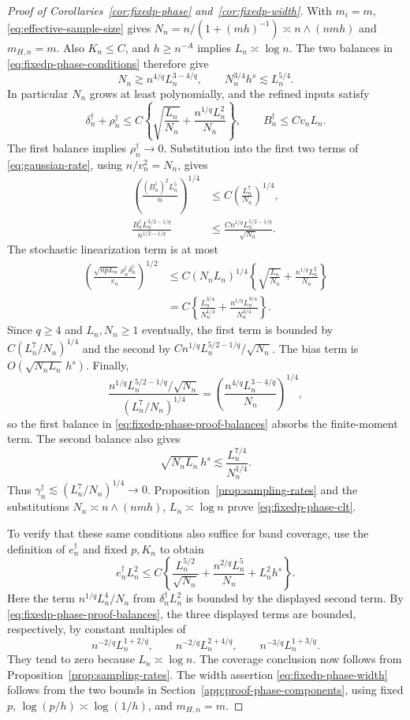 \documentclass[12pt]{article}
\numberwithin{equation}{section}
\begin{document}
\begin{proof}[Proof of Corollaries~\ref{cor:fixedp-phase} and~\ref{cor:fixedp-width}]
With $m_i=m$, \eqref{eq:effective-sample-size} gives
$N_n=n/(1+(mh)^{-1})\asymp n\wedge(nmh)$ and $m_{H,n}=m$.
Also $K_n\le C$, and $h\ge n^{-A}$ implies $L_n\asymp\log n$.
The two balances in \eqref{eq:fixedp-phase-conditions} therefore give
\begin{equation}
N_n\gtrsim n^{4/q}L_n^{3-4/q},\qquad
N_n^{3/4}h^s\lesssim L_n^{5/4}.
\label{eq:fixedp-phase-proof-balances}
\end{equation}
In particular $N_n$ grows at least polynomially, and the refined inputs
satisfy
\[
\delta_n^\dagger+\rho_n^\dagger
\le C\left\{\sqrt{\frac{L_n}{N_n}}
+\frac{n^{1/q}L_n^2}{N_n}\right\},\qquad
B_n^\dagger\le Cv_nL_n.
\]
The first balance implies $\rho_n^\dagger\to0$.
Substitution into the first two terms of
\eqref{eq:gaussian-rate}, using $n/v_n^2=N_n$, gives
\begin{align*}
\left(\frac{(B_n^\dagger)^2L_n^5}{n}\right)^{1/4}
&\le C\left(\frac{L_n^7}{N_n}\right)^{1/4},\\
\frac{B_n^\dagger L_n^{3/2-1/q}}{n^{1/2-1/q}}
&\le\frac{Cn^{1/q}L_n^{5/2-1/q}}{\sqrt{N_n}}.
\end{align*}
The stochastic linearization term is at most
\[
\begin{aligned}
\left(\frac{\sqrt{npL_n}\,
\rho_n^\dagger\delta_n^\dagger}{v_n}\right)^{1/2}
&\le C(N_nL_n)^{1/4}
\left\{\sqrt{\frac{L_n}{N_n}}
+\frac{n^{1/q}L_n^2}{N_n}\right\}\\
&=C\left\{\frac{L_n^{3/4}}{N_n^{1/4}}
+\frac{n^{1/q}L_n^{9/4}}{N_n^{3/4}}\right\}.
\end{aligned}
\]
Since $q\ge4$ and $L_n,N_n\ge1$ eventually, the first term is bounded
by $C(L_n^7/N_n)^{1/4}$ and the second by
$Cn^{1/q}L_n^{5/2-1/q}/\sqrt{N_n}$. The bias term is
$O(\sqrt{N_nL_n}\,h^s)$. Finally,
\[
\frac{n^{1/q}L_n^{5/2-1/q}/\sqrt{N_n}}
{(L_n^7/N_n)^{1/4}}
=\left(\frac{n^{4/q}L_n^{3-4/q}}{N_n}\right)^{1/4},
\]
so the first balance in \eqref{eq:fixedp-phase-proof-balances} absorbs
the finite-moment term. The second balance also gives
\[
\sqrt{N_nL_n}\,h^s
\lesssim\frac{L_n^{7/4}}{N_n^{1/4}}.
\]
Thus $\gamma_n^\dagger\lesssim(L_n^7/N_n)^{1/4}\to0$.
Proposition~\ref{prop:sampling-rates} and the substitutions
$N_n\asymp n\wedge(nmh)$, $L_n\asymp\log n$ prove
\eqref{eq:fixedp-phase-clt}.

To verify that these same conditions also suffice for band coverage,
use the definition of $e_n^\dagger$ and fixed $p,K_n$ to obtain
\[
e_n^\dagger L_n^2\le C\left\{
\frac{L_n^{5/2}}{\sqrt{N_n}}
+\frac{n^{2/q}L_n^5}{N_n}+L_n^2h^s\right\}.
\]
Here the term $n^{1/q}L_n^4/N_n$ from
$\delta_n^\dagger L_n^2$ is bounded by the displayed second term.
By \eqref{eq:fixedp-phase-proof-balances}, the three displayed terms
are bounded, respectively, by constant multiples of
\[
n^{-2/q}L_n^{1+2/q},\qquad
n^{-2/q}L_n^{2+4/q},\qquad
n^{-3/q}L_n^{1+3/q}.
\]
They tend to zero because $L_n\asymp\log n$. The coverage conclusion
now follows from Proposition~\ref{prop:sampling-rates}.
The width assertion \eqref{eq:fixedp-phase-width} follows from the two
bounds in Section~\ref{app:proof-phase-components}, using fixed $p$,
$\log(p/h)\asymp\log(1/h)$, and $m_{H,n}=m$.


\end{proof}
\end{document}
